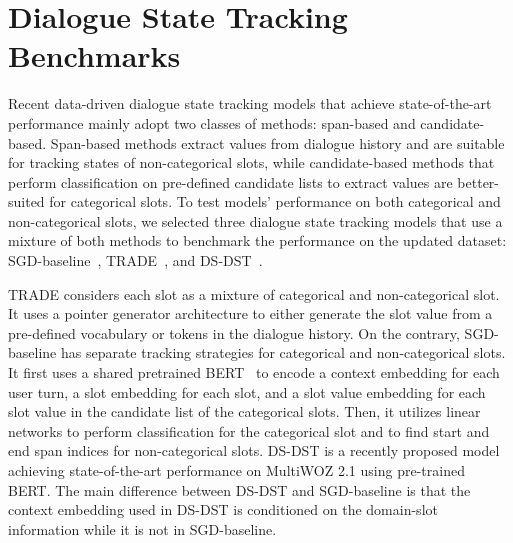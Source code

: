 \section{Dialogue State Tracking Benchmarks}
\label{sec:benchmark}
Recent data-driven dialogue state tracking models that achieve state-of-the-art performance mainly adopt two classes of methods: span-based and candidate-based. Span-based methods extract values from dialogue history and are suitable for tracking states of non-categorical slots, while candidate-based methods that perform classification on pre-defined candidate lists to extract values are better-suited for categorical slots. 
To test models' performance on both categorical and non-categorical slots, we selected three dialogue state tracking models that use a mixture of both methods to benchmark the performance on the updated dataset: SGD-baseline~\cite{rastogi2019scalable}, TRADE~\cite{WuTradeDST2019}, and DS-DST~\cite{zhang2019find}.

TRADE considers each slot as a mixture of categorical and non-categorical slot. It uses a pointer generator architecture to either generate the slot value from a pre-defined vocabulary or tokens in the dialogue history.
On the contrary, SGD-baseline has separate tracking strategies for categorical and non-categorical slots. It first uses a shared pretrained BERT~\cite{devlin2018bert} to encode a context embedding for each user turn, a slot embedding for each slot, and a slot value embedding for each slot value in the candidate list of the categorical slots. Then, it utilizes linear networks to perform classification for the categorical slot and to find start and end span indices for non-categorical slots. DS-DST is a recently proposed model achieving state-of-the-art performance on MultiWOZ 2.1 using pre-trained BERT. The main difference between DS-DST and SGD-baseline is that the context embedding used in DS-DST is conditioned on the domain-slot information while it is not in SGD-baseline.


